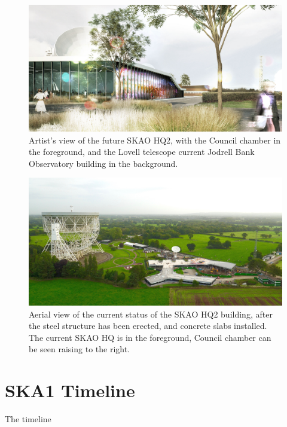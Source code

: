\documentclass[a4paper,
               biblatex,       %
               keeplastbox,    %
               ]{jacow-2_1}    %
\begin{document}
\begin{figure}[!htb]
  \centering
    \includegraphics[width=\columnwidth]{SKA-HQ-render.jpg}
  \caption{Artist's view of the future SKAO HQ2, with the Council chamber in the foreground, and the Lovell telescope current Jodrell Bank Observatory building in the background.}
  \label{fig:SKA-HQ-render}
\end{figure}

\begin{figure}[!htb]
  \centering
    \includegraphics[width=\columnwidth]{SKA-HQ2-aerial.jpg}
  \caption{Aerial view of the current status of the SKAO HQ2 building, after the steel structure has been erected, and concrete slabs installed. The current SKAO HQ is in the foreground, Council chamber can be seen raising to the right.}
  \label{fig:SKA-HQ2-aerial}
\end{figure}




\section{SKA1 Timeline} %
\label{sec:ska1_timeline}
The timeline 
\end{document}
